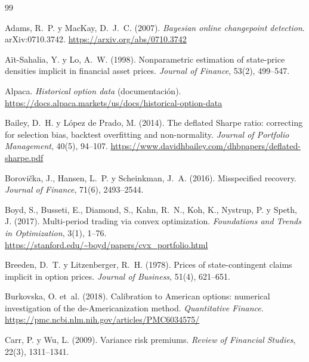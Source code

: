 \renewcommand{\refname}{Referencias}
\begin{thebibliography}{99}
\small
\setlength{\itemsep}{2pt}

Adams, R.~P. y MacKay, D.~J.~C. (2007). \emph{Bayesian online changepoint detection}. arXiv:0710.3742.
\url{https://arxiv.org/abs/0710.3742}

A{\"i}t-Sahalia, Y. y Lo, A.~W. (1998). Nonparametric estimation of state-price densities implicit in
financial asset prices. \emph{Journal of Finance}, 53(2), 499--547.

Alpaca. \emph{Historical option data} (documentación). \url{https://docs.alpaca.markets/us/docs/historical-option-data}

Bailey, D.~H. y López de Prado, M. (2014). The deflated Sharpe ratio: correcting for selection bias,
backtest overfitting and non-normality. \emph{Journal of Portfolio Management}, 40(5), 94--107.
\url{https://www.davidhbailey.com/dhbpapers/deflated-sharpe.pdf}

Borovička, J., Hansen, L.~P. y Scheinkman, J.~A. (2016). Misspecified recovery. \emph{Journal of
Finance}, 71(6), 2493--2544.

Boyd, S., Busseti, E., Diamond, S., Kahn, R.~N., Koh, K., Nystrup, P. y Speth, J. (2017). Multi-period
trading via convex optimization. \emph{Foundations and Trends in Optimization}, 3(1), 1--76.
\url{https://stanford.edu/~boyd/papers/cvx_portfolio.html}

Breeden, D.~T. y Litzenberger, R.~H. (1978). Prices of state-contingent claims implicit in option prices.
\emph{Journal of Business}, 51(4), 621--651.

Burkovska, O. et~al. (2018). Calibration to American options: numerical investigation of the
de-Americanization method. \emph{Quantitative Finance}. \url{https://pmc.ncbi.nlm.nih.gov/articles/PMC6034575/}

Carr, P. y Wu, L. (2009). Variance risk premiums. \emph{Review of Financial Studies}, 22(3), 1311--1341.


\end{thebibliography}
